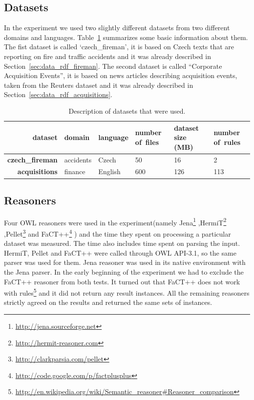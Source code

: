 \subsection{Datasets} \label{sec:onto_datasets}

In the experiment we used two slightly different datasets from two different domains and languages.  Table~\ref{tab:datasets} summarizes some basic information about them. The fist dataset is called `czech\_fireman', it is based on Czech texts that are reporting on fire and traffic accidents and it was already described in Section~\ref{sec:data_rdf_fireman}. The second dataset is called ``Corporate Acquisition Events'', it is based on news articles describing acquisition events, taken from the Reuters dataset and it was already described in Section~\ref{sec:data_rdf_acquisitions}.

\begin{table}
\begin{center}
\begin{tabular}{|r||l|l|b{20mm}|b{20mm}|b{20mm}|}
\hline
dataset & domain & language & number of~files &  dataset size (MB) &  number of~rules  \\
\hline
\hline
\textbf{czech\_fireman} & accidents & Czech &  50 &  16 &  2\\
\hline
\textbf{acquisitions} & finance & English &  600 &  126 &  113\\
\hline
\end{tabular}
\caption{Description of datasets that were used.}\label{tab:datasets}
\end{center}
\end{table}




\subsection{Reasoners} \label{sec:onto_reasoners}

Four OWL reasoners were used in the experiment(namely
Jena\footnote{\url{http://jena.sourceforge.net}}
,HermiT\footnote{\url{http://hermit-reasoner.com}}
,Pellet\footnote{\url{http://clarkparsia.com/pellet}}
and FaCT++\footnote{\url{http://code.google.com/p/factplusplus}}
) and the time they spent on processing a particular dataset was measured. The time also includes time spent on parsing the input. HermiT, Pellet and FaCT++ were called through OWL API-3.1, so the same parser was used for them. Jena reasoner was used in its native environment with the Jena parser.
In the early beginning of the experiment we had to exclude the FaCT++ reasoner from both tests. It turned out that FaCT++ does not work with rules\footnote{\url{http://en.wikipedia.org/wiki/Semantic_reasoner#Reasoner_comparison}} and it did not return any result instances.  All the remaining reasoners strictly agreed on the results and returned the same sets of instances.

